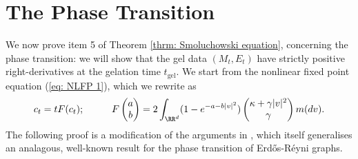 \section{The Phase Transition}\label{sec: BNCP} We now prove item 5 of Theorem \ref{thrm: Smoluchowski equation}, concerning the phase transition: we will show that the gel data $(M_t, E_t)$ have strictly positive right-derivatives at the gelation time $t_\mathrm{gel}$. We start from the nonlinear fixed point equation (\ref{eq: NLFP 1}), which we rewrite as \begin{equation}\label{eq: NLPF again}c_t=tF(c_t); \hspace{1cm} F\left(\begin{matrix} a \\ b \end{matrix}\right)=2\int_{\RR^d}(1-e^{-a-b|v|^2})\left(\begin{matrix}\kappa+\gamma|v|^2 \\ \gamma  \end{matrix}\right)m(dv). \end{equation} The following proof is a modification of the arguments in \cite[Theorem 3.17]{BJR07}, which itself generalises an analagous, well-known result for the phase transition of Erd\H{o}s-R\'eyni graphs.
